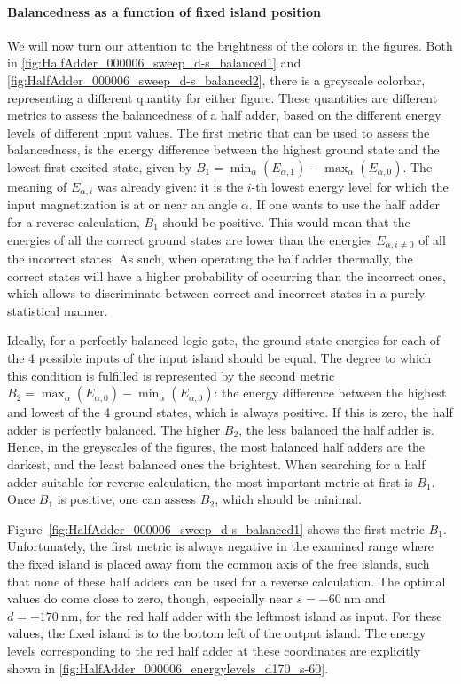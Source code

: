 \documentclass[11pt,a4paper,english]{article}
\begin{document}
\paragraph{Balancedness as a function of fixed island position}
We will now turn our attention to the brightness of the colors in the figures. Both in \cref{fig:HalfAdder_000006_sweep_d-s_balanced1} and \cref{fig:HalfAdder_000006_sweep_d-s_balanced2}, there is a greyscale colorbar, representing a different quantity for either figure. These quantities are different metrics to assess the balancedness of a half adder, based on the different energy levels of different input values. The first metric that can be used to assess the balancedness, is the energy difference between the highest ground state and the lowest first excited state, given by $B_1 = \min_\alpha(E_{\alpha,1}) - \max_\alpha(E_{\alpha,0})$. The meaning of $E_{\alpha,i}$ was already given: it is the $i$-th lowest energy level for which the input magnetization is at or near an angle $\alpha$. If one wants to use the half adder for a reverse calculation, $B_1$ should be positive. This would mean that the energies of all the correct ground states are lower than the energies $E_{\alpha,i\neq 0}$ of all the incorrect states. As such, when operating the half adder thermally, the correct states will have a higher probability of occurring than the incorrect ones, which allows to discriminate between correct and incorrect states in a purely statistical manner. \par
Ideally, for a perfectly balanced logic gate, the ground state energies for each of the 4 possible inputs of the input island should be equal. The degree to which this condition is fulfilled is represented by the second metric $B_2 = \max_\alpha(E_{\alpha,0}) - \min_\alpha(E_{\alpha,0})$: the energy difference between the highest and lowest of the 4 ground states, which is always positive. If this is zero, the half adder is perfectly balanced. The higher $B_2$, the less balanced the half adder is.
Hence, in the greyscales of the figures, the most balanced half adders are the darkest, and the least balanced ones the brightest. When searching for a half adder suitable for reverse calculation, the most important metric at first is $B_1$. Once $B_1$ is positive, one can assess $B_2$, which should be minimal. \par
Figure~\ref{fig:HalfAdder_000006_sweep_d-s_balanced1} shows the first metric $B_1$. Unfortunately, the first metric is always negative in the examined range where the fixed island is placed away from the common axis of the free islands, such that none of these half adders can be used for a reverse calculation. The optimal values do come close to zero, though, especially near $s=\SI{-60}{\nano\metre}$ and $d=\SI{-170}{\nano\metre}$, for the red half adder with the leftmost island as input. For these values, the fixed island is to the bottom left of the output island. The energy levels corresponding to the red half adder at these coordinates are explicitly shown in \cref{fig:HalfAdder_000006_energylevels_d170_s-60}.
\end{document}
